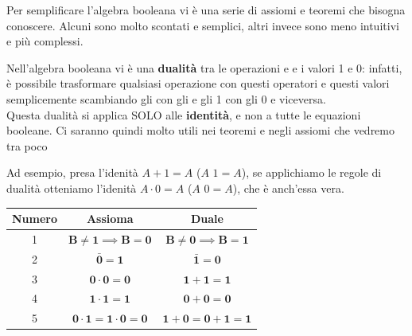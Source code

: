 \documentclass[11pt, a4paper, titlepage, oneside]{scrbook}
\begin{document}
Per semplificare l'algebra booleana vi è una serie di assiomi e teoremi che bisogna conoscere. Alcuni sono molto scontati e semplici, altri invece sono meno intuitivi e più complessi.

\begin{Definizione}
\label{def-dualità-algebra-booleana}
Nell'algebra booleana vi è una \textbf{dualità} tra le operazioni  e  e i valori 1 e 0: infatti, è possibile trasformare qualsiasi operazione con questi operatori e questi valori semplicemente scambiando gli  con gli  e gli 1 con gli 0 e viceversa. \\
\NB Questa dualità si applica SOLO alle \textbf{identità}, e non a tutte le equazioni booleane. Ci saranno quindi molto utili nei teoremi e negli assiomi che vedremo tra poco
\end{Definizione}

Ad esempio, presa l'idenità $A + 1 = A$ ($A$  $1 = A$), se applichiamo le regole di dualità otteniamo l'idenità $A \cdot 0 = A$ ($A$  $0 = A$), che è anch'essa vera.  

\begin{Proprieta}[Assiomi]
\label{prop-assiomi}
\begin{center}
\begin{tabular}{|c|c|c|}
    \hline
    \textbf{Numero} & \textbf{Assioma} & \textbf{Duale} \\
    \hline
    1 &$\bm{B \neq 1} \implies \bm{B = 0}$ & $\bm{B \neq 0} \implies \bm{B = 1}$ \\
    \hline
    2 & $\bm{\bar{0} = 1}$ & $\bm{\bar{1} = 0}$ \\
    \hline
    3 & $\bm{0 \cdot 0 = 0}$ & $\bm{1 + 1 = 1}$ \\
    \hline
    4 & $\bm{1 \cdot 1 = 1}$ & $\bm{0 + 0 = 0}$ \\
    \hline
    5 &$\bm{0 \cdot 1 = 1 \cdot 0 = 0}$ & $\bm{1 + 0 = 0 + 1 = 1}$ \\
    \hline
\end{tabular}
\end{center}
\end{Proprieta}
\end{document}
